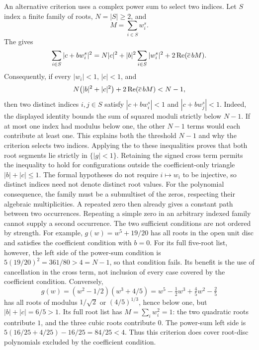 \documentclass[11pt]{article}
\begin{document}
An alternative criterion uses a complex power sum to select two
indices. Let $S$ index a finite family of roots, $N=|S|\ge2$, and
\[
  M=\sum_{i\in S}w_i^s.
\]
The  gives
\[
 \sum_{i\in S}|c+bw_i^s|^2
 =N|c|^2+|b|^2\sum_{i\in S}|w_i^s|^2
   +2\mathop{\rm Re}(\overline c\,bM).
\]
Consequently, if every $|w_i|<1$, $|c|<1$, and
\[
 N\bigl(|b|^2+|c|^2\bigr)
   +2\mathop{\rm Re}(\overline c\,bM)<N-1,
\]
then two distinct indices $i,j\in S$ satisfy
$|c+bw_i^s|<1$ and $|c+bw_j^s|<1$. Indeed, the displayed identity
bounds the sum of squared moduli strictly below $N-1$. If at most one
index had modulus below one, the other $N-1$ terms would each contribute
at least one. This explains both the threshold $N-1$ and why the
criterion selects two indices. Applying the
 to these inequalities proves that both root segments lie
strictly in $\{|g|<1\}$.  Retaining the signed cross term permits the inequality to hold for configurations outside the coefficient-only triangle
$|b|+|c|\le1$.  The formal hypotheses do not require $i\mapsto w_i$ to be
injective, so distinct indices need not denote distinct root values.
For the polynomial consequence, the family must be a submultiset of the
zeros, respecting their algebraic multiplicities. A repeated zero then
already gives a constant path between two occurrences. Repeating a simple
zero in an arbitrary indexed family cannot supply a second occurrence.
The two sufficient conditions are not ordered by strength. For example,
$g(w)=w^5+19/20$ has all roots in the open unit disc and satisfies the
coefficient condition with $b=0$. For its full five-root list, however,
the left side of the power-sum condition is
$5(19/20)^2=361/80>4=N-1$, so that condition fails. Its benefit is the
use of cancellation in the cross term, not inclusion of every case
covered by the coefficient condition. Conversely,
\[
 g(w)=(w^2-1/2)(w^3+4/5)
     =w^5-\tfrac12w^3+\tfrac45w^2-\tfrac25
\]
has all roots of modulus $1/\sqrt2$ or $(4/5)^{1/3}$, hence below
one, but $|b|+|c|=6/5>1$. Its full root list has
$M=\sum_iw_i^2=1$: the two quadratic roots contribute $1$, and the
three cubic roots contribute $0$. The power-sum left side is
$5(16/25+4/25)-16/25=84/25<4$. Thus this criterion does cover
root-disc polynomials excluded by the coefficient condition.
\end{document}
